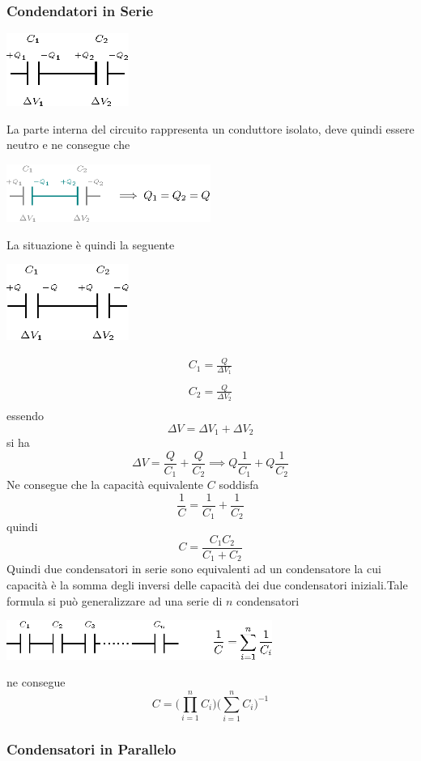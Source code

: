 \documentclass[10pt, letterpaper]{report}
\begin{document}
\subsubsection{Condendatori in Serie}
\begin{center}
    \includegraphics[width=0.3\textwidth]{images/condensatoreSerie1.eps}
\end{center} 
La parte interna del circuito rappresenta un conduttore isolato, deve quindi essere neutro e ne consegue che 
\begin{center}
    \includegraphics[width=0.5\textwidth]{images/condensatoreSerie2.eps}
\end{center} 
La situazione è quindi la seguente 
\begin{center}
    \includegraphics[width=0.3\textwidth]{images/condensatoreSerie3.eps}
\end{center} 
$$ \begin{matrix}
    C_1 = \frac{Q}{\Delta V_1}\\ \\
    C_2 = \frac{Q}{\Delta V_2} \\ 
\end{matrix}$$essendo
$$ 
\Delta V = \Delta V_1+\Delta V_2
$$ si ha 
$$ 
 \Delta V=\frac{Q}{C_1}+\frac{Q}{C_2}\implies Q\frac{1}{C_1}+Q\frac{1}{C_2}$$
 Ne consegue che la capacità equivalente $C$ soddisfa 
 $$ \frac{1}{C}=\frac{1}{C_1}+\frac{1}{C_2}$$
 quindi 
 $$ C=\frac{C_1C_2}{C_1+C_2}$$
Quindi due condensatori in serie sono equivalenti ad un condensatore la cui capacità è la somma degli inversi delle capacità dei due condensatori iniziali.\acc  Tale formula si può generalizzare ad una serie di $n$ condensatori\begin{center}
    \includegraphics[width=0.65\textwidth]{images/condensatoreSerie4.eps}
\end{center} 
ne consegue 
$$ C=\Big(\displaystyle  \prod_{i=1}^n C_i\Big)\Big(\displaystyle \sum_{i=1}^n C_i\Big)^{-1}$$
\subsubsection{Condensatori in Parallelo}
\end{document}
